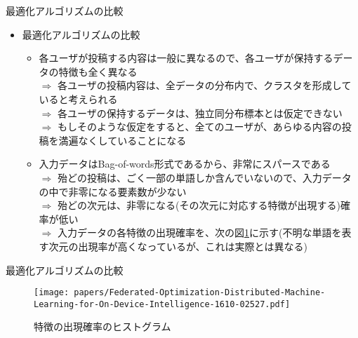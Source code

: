 \documentclass[dvipdfmx,notheorems,t]{beamer}
\begin{document}
\begin{frame}{最適化アルゴリズムの比較}

\begin{itemize}
	\item 最適化アルゴリズムの比較
	\begin{itemize}
		\item 各ユーザが投稿する内容は一般に異なるので、各ユーザが保持するデータの特徴も全く異なる \\
		$\Rightarrow$ 各ユーザの投稿内容は、全データの分布内で、クラスタを形成していると考えられる \\
		$\Rightarrow$ 各ユーザの保持するデータは、独立同分布標本とは\alert{仮定できない} \\
		$\Rightarrow$ もしそのような仮定をすると、全てのユーザが、あらゆる内容の投稿を満遍なくしていることになる
		\newline
		
		\item 入力データはBag-of-words形式であるから、非常にスパースである \\
		$\Rightarrow$ 殆どの投稿は、ごく一部の単語しか含んでいないので、入力データの中で非零になる要素数が少ない \\
		$\Rightarrow$ 殆どの次元は、非零になる(その次元に対応する特徴が出現する)確率が低い \\
		$\Rightarrow$ 入力データの各特徴の出現確率を、次の図\ref{fig:feature-appearance-on-nodes}に示す(不明な単語を表す次元の出現率が高くなっているが、これは実際とは異なる)
	\end{itemize}
\end{itemize}

\end{frame}

\begin{frame}{最適化アルゴリズムの比較}

\begin{figure}
	\centering
	\texttt{[image: papers/Federated-Optimization-Distributed-Machine-Learning-for-On-Device-Intelligence-1610-02527.pdf]}
	\caption{特徴の出現確率のヒストグラム~\cite{1610.02527}}
	\label{fig:feature-appearance-on-nodes}
\end{figure}

\end{frame}
\end{document}
